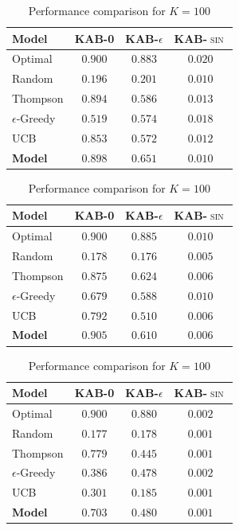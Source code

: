 \begin{table}[H]
\centering
\caption{Performance comparison for $K=100$}
\label{tab:k100}
\begin{tabular}{l c c c}
\toprule
\textbf{Model} & \textbf{\textsc{KAB-0}} & \textbf{\textsc{KAB-$\epsilon$}} & \textbf{\textsc{KAB-$\sin$}} \\
\midrule
Optimal & $0.900$ & $0.883$ & $0.020$  \\
Random & $0.196$ & $0.201$ & $0.010$ \\
\midrule
Thompson & $0.894$ & $0.586$ & $0.013$ \\
$\epsilon$-Greedy & $0.519$ & $0.574$ & $0.018$ \\
UCB & $0.853$ & $0.572$ & $0.012$ \\
\textbf{Model} & $\mathbf{0.898}$ & $\mathbf{0.651}$ & $\mathbf{0.010}$  \\
\bottomrule
\end{tabular}
\end{table}

\begin{table}[H]
\centering
\caption{Performance comparison for $K=100$}
\label{tab:k200}
\begin{tabular}{l c c c}
\toprule
\textbf{Model} & \textbf{\textsc{KAB-0}} & \textbf{\textsc{KAB-$\epsilon$}} & \textbf{\textsc{KAB-$\sin$}} \\
\midrule
Optimal & $0.900$ & $0.885$ & $0.010$  \\
Random & $0.178$ & $0.176$ & $0.005$ \\
\midrule
Thompson & $0.875$ & $0.624$ & $0.006$ \\
$\epsilon$-Greedy & $0.679$ & $0.588$ & $0.010$ \\
UCB & $0.792$ & $0.510$ & $0.006$ \\
\textbf{Model} & $\mathbf{0.905}$ & $\mathbf{0.610}$ & $\mathbf{0.006}$  \\
\bottomrule
\end{tabular}
\end{table}

\begin{table}[H]
\centering
\caption{Performance comparison for $K=100$}
\label{tab:k1000}
\begin{tabular}{l c c c}
\toprule
\textbf{Model} & \textbf{\textsc{KAB-0}} & \textbf{\textsc{KAB-$\epsilon$}} & \textbf{\textsc{KAB-$\sin$}} \\
\midrule
Optimal & $0.900$ & $0.880$ & $0.002$  \\
Random & $0.177$ & $0.178$ & $0.001$ \\
\midrule
Thompson & $0.779$ & $0.445$ & $0.001$ \\
$\epsilon$-Greedy & $0.386$ & $0.478$ & $0.002$ \\
UCB & $0.301$ & $0.185$ & $0.001$ \\
\textbf{Model} & $\mathbf{0.703}$ & $\mathbf{0.480}$ & $\mathbf{0.001}$  \\
\bottomrule
\end{tabular}
\end{table}


\newpage
